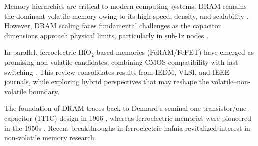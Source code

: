 Memory hierarchies are critical to modern computing systems. DRAM remains the dominant volatile memory owing to its high speed, density, and scalability \cite{choi2022,kim2021_dram}. However, DRAM scaling faces fundamental challenges as the capacitor dimensions approach physical limits, particularly in sub-1z nodes \cite{kim2021_dram,iedm2023_dram}. 

In parallel, ferroelectric HfO$_2$-based memories (FeRAM/FeFET) have emerged as promising non-volatile candidates, combining CMOS compatibility with fast switching \cite{boscke2011,mueller2012,noheda2023}. This review consolidates results from IEDM, VLSI, and IEEE journals, while exploring hybrid perspectives that may reshape the volatile--non-volatile boundary.

The foundation of DRAM traces back to Dennard's seminal one-transistor/one-capacitor (1T1C) design in 1966 \cite{dennard1966}, whereas ferroelectric memories were pioneered in the 1950s \cite{scott1998}. Recent breakthroughs in ferroelectric hafnia \cite{boscke2011,mueller2012} revitalized interest in non-volatile memory research.
